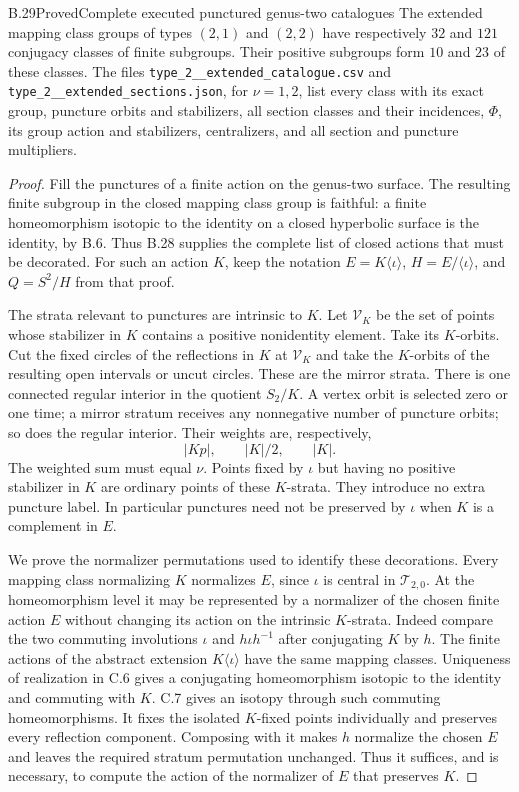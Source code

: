\begin{claim}{B.29}{Proved}{Complete executed punctured genus-two catalogues}
The extended mapping class groups of types $(2,1)$ and $(2,2)$ have
respectively $32$ and $121$ conjugacy classes of finite subgroups.
Their positive subgroups form $10$ and $23$ of these classes.
The files \texttt{type\_2\_\nu\_extended\_catalogue.csv} and
\texttt{type\_2\_\nu\_extended\_sections.json}, for $\nu=1,2$,
list every class with its exact group, puncture orbits and stabilizers,
all section classes and their incidences, $\Phi$, its group action
and stabilizers, centralizers, and all section and puncture multipliers.
\end{claim}
\begin{proof}
Fill the punctures of a finite action on the genus-two surface.
The resulting finite subgroup in the closed mapping class group is
faithful: a finite homeomorphism isotopic to the identity on a closed
hyperbolic surface is the identity, by B.6.  Thus B.28 supplies the
complete list of closed actions that must be decorated.
For such an action $K$, keep the notation
$E=K\langle\iota\rangle$, $H=E/\langle\iota\rangle$, and
$Q=S^2/H$ from that proof.

The strata relevant to punctures are intrinsic to $K$.
Let $\mathcal V_K$ be the set of points whose stabilizer in $K$
contains a positive nonidentity element.  Take its $K$-orbits.
Cut the fixed circles of the reflections in $K$ at
$\mathcal V_K$ and take the $K$-orbits of the resulting open
intervals or uncut circles.  These are the mirror strata.
There is one connected regular interior in the quotient $S_2/K$.
A vertex orbit is selected zero or one time; a mirror stratum
receives any nonnegative number of puncture orbits; so does the
regular interior.  Their weights are, respectively,
\[
       |Kp|,\qquad |K|/2,\qquad |K|.                  \tag{B.29.1}
\]
The weighted sum must equal $\nu$.
Points fixed by $\iota$ but having no positive stabilizer in $K$
are ordinary points of these $K$-strata.  They introduce no extra
puncture label.  In particular punctures need not be preserved
by $\iota$ when $K$ is a complement in $E$.

We prove the normalizer permutations used to identify these
decorations.  Every mapping class normalizing $K$ normalizes $E$,
since $\iota$ is central in $\mathcal T_{2,0}$.  At the homeomorphism
level it may be represented by a normalizer of the chosen finite
action $E$ without changing its action on the intrinsic $K$-strata.
Indeed compare the two commuting involutions $\iota$ and
$h\iota h^{-1}$ after conjugating $K$ by $h$.  The finite actions of
the abstract extension $K\langle\iota\rangle$ have the same mapping
classes.  Uniqueness of realization in C.6 gives a conjugating
homeomorphism isotopic to the identity and commuting with $K$.
C.7 gives an isotopy through such commuting homeomorphisms.
It fixes the isolated $K$-fixed points individually and preserves
every reflection component.  Composing with it makes $h$ normalize
the chosen $E$ and leaves the required stratum permutation unchanged.
Thus it suffices, and is necessary, to compute the action of the
normalizer of $E$ that preserves $K$.


\end{proof}
